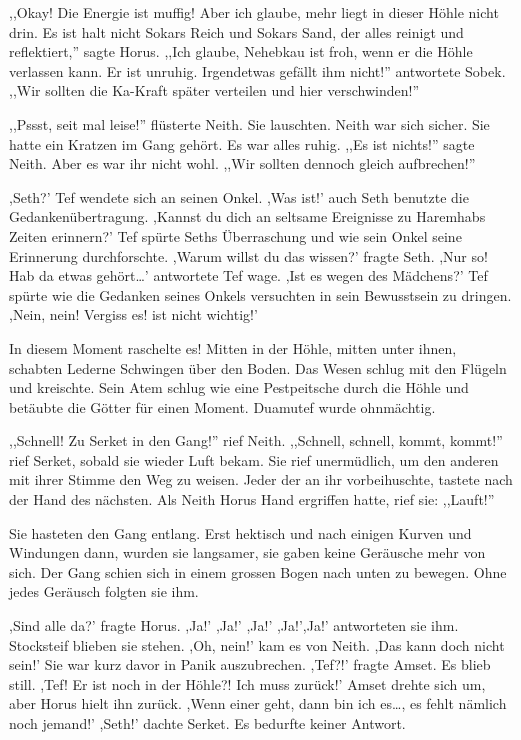 \documentclass[11pt,titlepage,a5paper]{book}
\begin{document}
,,Okay! Die Energie ist muffig! Aber ich glaube, mehr liegt in dieser Höhle nicht drin. Es ist halt nicht Sokars Reich und Sokars Sand, der alles reinigt und reflektiert,''  sagte Horus. ,,Ich glaube, Nehebkau ist froh, wenn er die Höhle verlassen kann. Er ist unruhig. Irgendetwas gefällt ihm nicht!'' antwortete Sobek. ,,Wir sollten die Ka-Kraft später verteilen und hier verschwinden!''

,,Pssst, seit mal leise!'' flüsterte Neith. Sie lauschten. Neith war sich sicher. Sie hatte ein Kratzen im Gang gehört. Es war alles ruhig. ,,Es ist nichts!'' sagte Neith. Aber es war ihr nicht wohl. ,,Wir sollten dennoch gleich aufbrechen!''  

,Seth?' Tef wendete sich an seinen Onkel. ,Was ist!' auch Seth benutzte die Gedankenübertragung. ,Kannst du dich an seltsame Ereignisse zu Haremhabs Zeiten erinnern?' Tef spürte Seths Überraschung und wie sein Onkel seine Erinnerung durchforschte. ,Warum willst du das wissen?' fragte Seth. ,Nur so! Hab da etwas gehört\dots' antwortete Tef wage. ,Ist es wegen des Mädchens?' Tef spürte wie die Gedanken seines Onkels versuchten in sein Bewusstsein zu dringen. ,Nein, nein! Vergiss es! ist nicht wichtig!'

In diesem Moment raschelte es! Mitten in der Höhle, mitten unter ihnen, schabten Lederne Schwingen über den Boden. Das Wesen schlug mit den Flügeln und kreischte. Sein Atem schlug wie eine Pestpeitsche durch die Höhle und betäubte die Götter für einen Moment. Duamutef wurde ohnmächtig.

,,Schnell! Zu Serket in den Gang!'' rief Neith. ,,Schnell, schnell, kommt, kommt!'' rief Serket, sobald sie wieder Luft bekam. Sie rief unermüdlich, um den anderen mit ihrer Stimme den Weg zu weisen. Jeder der an ihr vorbeihuschte, tastete nach der Hand des nächsten. Als Neith Horus Hand ergriffen hatte, rief sie: ,,Lauft!''

Sie hasteten den Gang entlang. Erst hektisch und nach einigen Kurven und Windungen dann, wurden sie langsamer, sie gaben keine Geräusche mehr von sich. Der Gang schien sich in einem grossen Bogen nach unten zu bewegen. Ohne jedes Geräusch folgten sie ihm.

,Sind alle da?' fragte Horus. ,Ja!' ,Ja!' ,Ja!' ,Ja!',Ja!' antworteten sie ihm. Stocksteif blieben sie stehen. ,Oh, nein!' kam es von Neith. ,Das kann doch nicht sein!' Sie war kurz davor in Panik auszubrechen. ,Tef?!' fragte Amset. Es blieb still. ,Tef! Er ist noch in der Höhle?! Ich muss zurück!' Amset drehte sich um, aber Horus hielt ihn zurück. ,Wenn einer geht, dann bin ich es\dots, es fehlt nämlich noch jemand!' ,Seth!' dachte Serket. Es bedurfte keiner Antwort.
\end{document}
